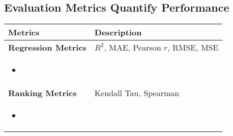\subsection{Evaluation Metrics Quantify Performance}
\begin{summary}
    \begin{center}
        \begin{tabular}{ll}
        \toprule
        \textbf{Metrics} & \textbf{Description} \\
        \midrule
        \textbf{Regression Metrics} & $R^2$, MAE, Pearson $r$, RMSE, MSE \\ 
        \multicolumn{2}{p{\linewidth}}{
        \begin{itemize}
            \item 
        \end{itemize}} \\
        \midrule
        \textbf{Ranking Metrics} & Kendall Tau, Spearman \\
        \multicolumn{2}{p{\linewidth}}{
        \begin{itemize}
            \item 
        \end{itemize}} \\
        \bottomrule
        \end{tabular}
    \end{center}
\end{summary}
\newpage

